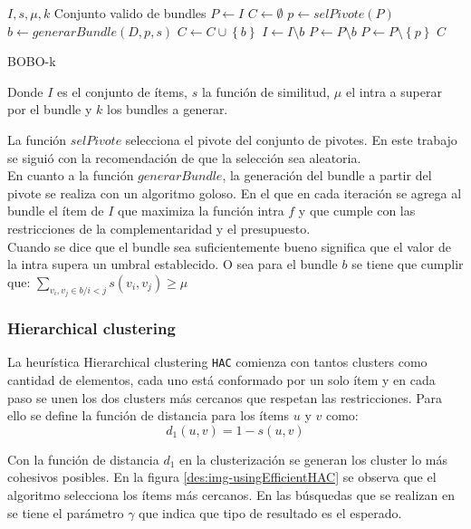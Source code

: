 \begin{algorithm}[H]
\begin{algorithmic}[1]
\REQUIRE $I, s, \mu, k $
\ENSURE Conjunto valido de bundles
\STATE $P \leftarrow I$
\STATE $C \leftarrow \emptyset$
\STATE $p \leftarrow selPivote(P)$
\STATE $b \leftarrow generarBundle(D, p, s)$
\STATE $C \leftarrow C \cup \left\{b\right\}$
\STATE $I \leftarrow I \setminus b$
\STATE $P \leftarrow P \setminus b$
\ELSE
\STATE $P \leftarrow P \setminus \left\{p\right\}$
\ENDIF
\ENDWHILE
\RETURN $C$
\end{algorithmic}
\caption{BOBO-k}\label{alg:bobo}
\end{algorithm}
Donde $I$ es el conjunto de ítems, $s$ la función de similitud, $\mu$ el intra a superar por el bundle y $k$ los bundles a generar.

La función $selPivote$ selecciona el pivote del conjunto de pivotes. En este trabajo se siguió con la recomendación de \cite{newSimilarity} que la selección sea aleatoria.\\
En cuanto a la función $generarBundle$, la generación del bundle a partir del pivote se realiza con un algoritmo goloso. En el que en cada iteración se agrega al bundle el ítem de $I$ que maximiza la función intra $f$ y que cumple con las restricciones de la complementaridad y el presupuesto.\\
Cuando se dice que el bundle sea suficientemente bueno significa que el valor de la intra supera un umbral establecido. O sea para el bundle $b$ se tiene que cumplir que: $\sum_{v_i, v_j \in b / i < j}{s(v_i,v_j)} \geq \mu$\\

\subsubsection{Hierarchical clustering}
La heurística Hierarchical clustering \texttt{HAC} comienza con tantos clusters como cantidad de elementos, cada uno está conformado por un solo ítem y en cada paso se unen los dos clusters más cercanos que respetan las restricciones. Para ello se define la función de distancia para los ítems $u$ y $v$ como:\\

\begin{equation} \label{des:eq-dist-d1}
d_{1}(u,v) = 1 - s(u, v)
\end{equation}

Con la función de distancia $d_{1}$ en la clusterización se generan los cluster lo más cohesivos posibles. En la figura \ref{des:img-usingEfficientHAC} se observa que el algoritmo selecciona los ítems más cercanos. En las búsquedas que se realizan en \cite{compositeRetrival} se tiene el parámetro $\gamma$ que indica que tipo de resultado es el esperado.

